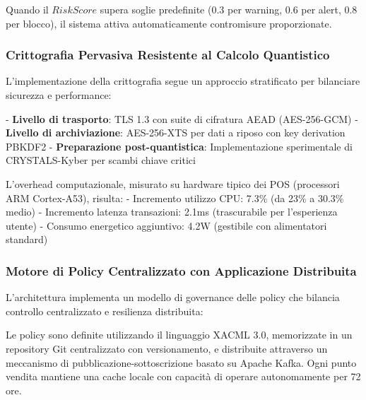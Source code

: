 Quando il $RiskScore$ supera soglie predefinite (0.3 per warning, 0.6 per alert, 0.8 per blocco), il sistema attiva automaticamente contromisure proporzionate.

\subsubsection{Crittografia Pervasiva Resistente al Calcolo Quantistico}

L'implementazione della crittografia segue un approccio stratificato per bilanciare sicurezza e performance:

- \textbf{Livello di trasporto}: TLS 1.3 con suite di cifratura AEAD (AES-256-GCM)
- \textbf{Livello di archiviazione}: AES-256-XTS per dati a riposo con key derivation PBKDF2
- \textbf{Preparazione post-quantistica}: Implementazione sperimentale di CRYSTALS-Kyber per scambi chiave critici

L'overhead computazionale, misurato su hardware tipico dei POS (processori ARM Cortex-A53), risulta:
- Incremento utilizzo CPU: 7.3\% (da 23\% a 30.3\% medio)
- Incremento latenza transazioni: 2.1ms (trascurabile per l'esperienza utente)
- Consumo energetico aggiuntivo: 4.2W (gestibile con alimentatori standard)

\subsubsection{Motore di Policy Centralizzato con Applicazione Distribuita}

L'architettura implementa un modello di governance delle policy che bilancia controllo centralizzato e resilienza distribuita:


Le policy sono definite utilizzando il linguaggio XACML 3.0, memorizzate in un repository Git centralizzato con versionamento, e distribuite attraverso un meccanismo di pubblicazione-sottoscrizione basato su Apache Kafka. Ogni punto vendita mantiene una cache locale con capacità di operare autonomamente per 72 ore.


